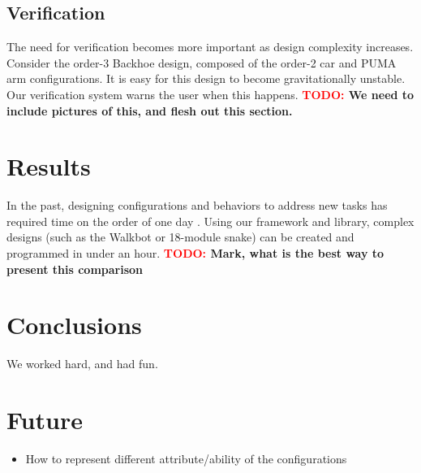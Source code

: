\documentclass[conference]{IEEEtran}
\theoremstyle{definition}
\newcommand{\TODO}[1]{ {\bf \textcolor{red}{TODO:} #1 }}
\begin{document}
\subsection{Verification}
The need for verification becomes more important as design complexity increases.
 Consider the order-3 Backhoe design, composed of the order-2 car and PUMA arm configurations.
 It is easy for this design to become gravitationally unstable.  Our verification
 system warns the user when this happens. \TODO{We need to include pictures of this,
and flesh out this section.}

\section{Results}
In the past, designing configurations and behaviors to address new tasks has required
time on the order of one day \cite{sastra2011using}. Using our framework and library,
complex designs (such as the Walkbot or 18-module snake) can be created and programmed
in under an hour. \TODO{Mark, what is the best
way to present this comparison} 

\section{Conclusions}
We worked hard, and had fun.

\section{Future}
\begin{itemize}
\item How to represent different attribute/ability of the configurations
\end{itemize}







\end{document}
